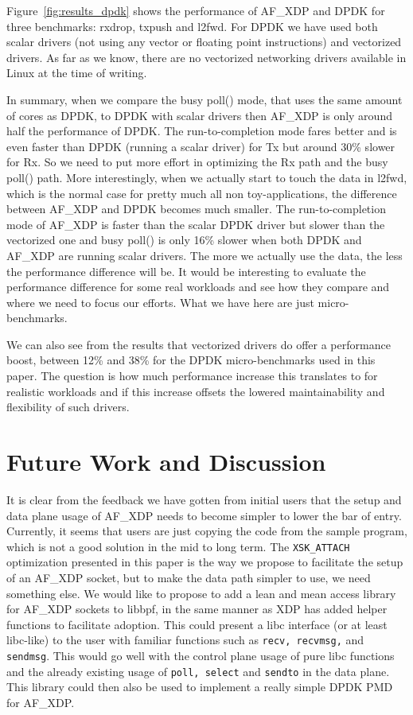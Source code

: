 \documentclass[9pt,numbers,reprint]{sigplanconf}
\begin{document}
Figure~\ref{fig:results_dpdk} shows the performance of AF\_XDP and
DPDK for three benchmarks: rxdrop, txpush and l2fwd. For DPDK we have
used both scalar drivers (not using any vector or floating point
instructions) and vectorized drivers. As far as we know, there are no
vectorized networking drivers available in Linux at the time of
writing.

In summary, when we compare the busy poll() mode, that uses the same
amount of cores as DPDK, to DPDK with scalar drivers then AF\_XDP is
only around half the performance of DPDK. The run-to-completion mode
fares better and is even faster than DPDK (running a scalar driver)
for Tx but around 30\% slower for Rx. So we need to put more effort in
optimizing the Rx path and the busy poll() path. More interestingly,
when we actually start to touch the data in l2fwd, which is the normal
case for pretty much all non toy-applications, the difference between
AF\_XDP and DPDK becomes much smaller. The run-to-completion mode of
AF\_XDP is faster than the scalar DPDK driver but slower than the
vectorized one and busy poll() is only 16\% slower when both DPDK and
AF\_XDP are running scalar drivers. The more we actually use the data,
the less the performance difference will be. It would be interesting
to evaluate the performance difference for some real workloads and see
how they compare and where we need to focus our efforts. What we have
here are just micro-benchmarks.

We can also see from the results that vectorized drivers do offer a
performance boost, between 12\% and 38\% for the DPDK micro-benchmarks
used in this paper. The question is how much performance increase this
translates to for realistic workloads and if this increase offsets the
lowered maintainability and flexibility of such drivers.


\section{Future Work and Discussion}
\label{sec:future}

It is clear from the feedback we have gotten from initial users that
the setup and data plane usage of AF\_XDP needs to become simpler to
lower the bar of entry. Currently, it seems that users are just
copying the code from the sample program, which is not a good solution
in the mid to long term. The {\tt XSK\_ATTACH} optimization presented
in this paper is the way we propose to facilitate the setup of an
AF\_XDP socket, but to make the data path simpler to use, we need
something else. We would like to propose to add a lean and mean access
library for AF\_XDP sockets to libbpf, in the same manner as XDP has
added helper functions to facilitate adoption. This could present a
libc interface (or at least libc-like) to the user with familiar
functions such as {\tt recv, recvmsg,} and {\tt sendmsg}. This would
go well with the control plane usage of pure libc functions and the
already existing usage of {\tt poll, select} and {\tt sendto} in the
data plane. This library could then also be used to implement a really
simple DPDK PMD for AF\_XDP.
\end{document}
